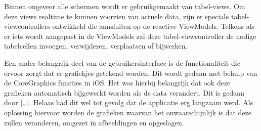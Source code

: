 Binnen ongeveer alle schermen wordt er gebruikgemaakt van tabel-views. Om deze views realtime te kunnen voorzien van actuele data, zijn er speciale tabel-viewcontrollers ontwikkeld die aansluiten op de reactive ViewModels. Telkens als er iets wordt aangepast in de ViewModels zal deze tabel-viewcontroller de nodige tabelcellen invoegen, verwijderen, verplaatsen of bijwerken.

Een ander belangrijk deel van de gebruikersinterface is de functionaliteit die ervoor zorgt dat er grafiekjes getekend worden. Dit wordt gedaan met behulp van de CoreGraphics functies in iOS. Het was hierbij belangrijk dat ook deze grafieken automatisch bijgewerkt worden als de data verandert. Dit is gedaan door […]. Helaas had dit wel tot gevolg dat de applicatie erg langzaam werd. Als oplossing hiervoor worden de grafieken waarvan het onwaarschijnlijk is dat deze zullen veranderen, omgezet in afbeeldingen en opgeslagen.